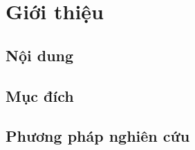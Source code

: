\section{Giới thiệu}

\subsection{Nội dung}

\subsection{Mục đích}

\subsection{Phương pháp nghiên cứu}

\newpage